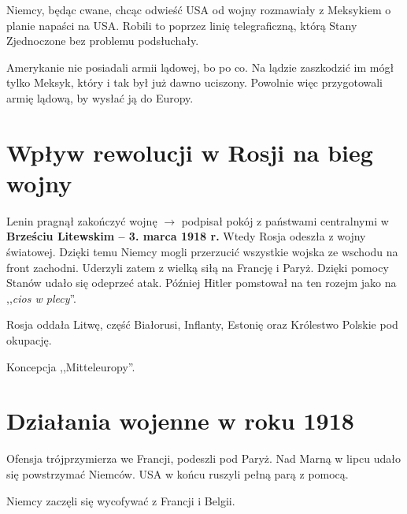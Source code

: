 \documentclass [a4paper, 11pt, oneside]{book}
\begin{document}
        Niemcy, będąc cwane, chcąc odwieść USA od wojny rozmawiały z Meksykiem o planie napaści na USA. Robili to poprzez linię telegraficzną, którą Stany Zjednoczone bez problemu podsłuchały.

        Amerykanie nie posiadali armii lądowej, bo po co. Na lądzie zaszkodzić im mógł tylko Meksyk, który i tak był już dawno uciszony. Powolnie więc przygotowali armię lądową, by wysłać ją do Europy.
    \section{Wpływ rewolucji w Rosji na bieg wojny} %
    \label{sec:wp_yw_rewolucji_w_rosji_na_bieg_wojny}
        Lenin pragnął zakończyć wojnę $\rightarrow$ podpisał pokój z państwami centralnymi w \textbf{Brześciu Litewskim -- 3. marca 1918 r.} Wtedy Rosja odeszła z wojny światowej. Dzięki temu Niemcy mogli przerzucić wszystkie wojska ze wschodu na front zachodni. Uderzyli zatem z wielką siłą na Francję i Paryż. Dzięki pomocy Stanów udało się odeprzeć atak. Później Hitler pomstował na ten rozejm jako na ,,\emph{cios w plecy}''.

        Rosja oddała Litwę, część Białorusi, Inflanty, Estonię oraz Królestwo Polskie pod okupację.

        Koncepcja ,,Mitteleuropy''.
    \section{Działania wojenne w roku 1918} %
    \label{sec:dzia_ania_wojenne_w_roku_1918}
        Ofensja trójprzymierza we Francji, podeszli pod Paryż. Nad Marną w lipcu udało się powstrzymać Niemców. USA w końcu ruszyli pełną parą z pomocą.

        Niemcy zaczęli się wycofywać z Francji i Belgii.
\end{document}
